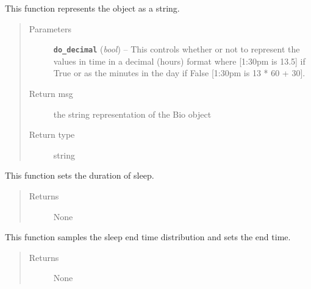 \documentclass[letterpaper,10pt,english]{sphinxmanual}
\begin{document}
\begin{fulllineitems}
\begin{fulllineitems}
\begin{quote}
\begin{description}
\end{description}\end{quote}

\end{fulllineitems}


\begin{fulllineitems}
\label{bio:bio.Bio.toString}
This function represents the {\hyperref[bio:bio.Bio]{\emph{}}} object as a string.
\begin{quote}\begin{description}
\item[{Parameters}] \leavevmode
\textbf{\texttt{do\_decimal}} (\emph{bool}) -- This controls whether or not to represent the values in time in a                                 decimal (hours) format where {[}1:30pm is 13.5{]} if True or as the minutes                                 in the day if False {[}1:30pm is 13 * 60 + 30{]}.

\item[{Return msg}] \leavevmode
the string representation of the Bio object

\item[{Return type}] \leavevmode
string

\end{description}\end{quote}

\end{fulllineitems}


\begin{fulllineitems}
\label{bio:bio.Bio.update_sleep_dt}
This function sets the duration of sleep.
\begin{quote}\begin{description}
\item[{Returns}] \leavevmode
None

\end{description}\end{quote}

\end{fulllineitems}


\begin{fulllineitems}
\label{bio:bio.Bio.update_sleep_end}
This function samples the sleep end time distribution and sets the end time.
\begin{quote}\begin{description}
\item[{Returns}] \leavevmode
None


\end{description}
\end{quote}
\end{fulllineitems}
\end{fulllineitems}
\end{document}
